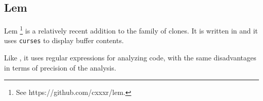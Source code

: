 \subsection{Lem}

Lem%
\footnote{See https://github.com/cxxxr/lem.}
is a relatively recent addition to the family of \emacs{} clones.  It
is written in \commonlisp{} and it uses \texttt{curses} to display
buffer contents.

Like \emacs{} , it uses regular expressions
for analyzing \commonlisp{} code, with the same disadvantages in terms
of precision of the analysis.
